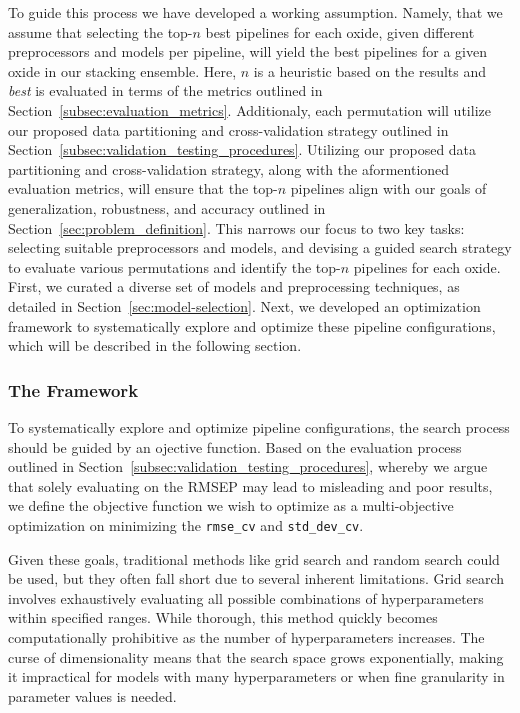 To guide this process we have developed a working assumption.
Namely, that we assume that selecting the top-$n$ best pipelines for each oxide, given different preprocessors and models per pipeline, will yield the best pipelines for a given oxide in our stacking ensemble.
Here, $n$ is a heuristic based on the results and \textit{best} is evaluated in terms of the metrics outlined in Section~\ref{subsec:evaluation_metrics}.
Additionaly, each permutation will utilize our proposed data partitioning and cross-validation strategy outlined in Section~\ref{subsec:validation_testing_procedures}.
Utilizing our proposed data partitioning and cross-validation strategy, along with the aformentioned evaluation metrics, will ensure that the top-$n$ pipelines align with our goals of generalization, robustness, and accuracy outlined in Section~\ref{sec:problem_definition}.
This narrows our focus to two key tasks: selecting suitable preprocessors and models, and devising a guided search strategy to evaluate various permutations and identify the top-$n$ pipelines for each oxide. 
First, we curated a diverse set of models and preprocessing techniques, as detailed in Section~\ref{sec:model-selection}.
Next, we developed an optimization framework to systematically explore and optimize these pipeline configurations, which will be described in the following section.

\subsubsection{The Framework}
To systematically explore and optimize pipeline configurations, the search process should be guided by an ojective function.
Based on the evaluation process outlined in Section~\ref{subsec:validation_testing_procedures}, whereby we argue that solely evaluating on the RMSEP may lead to misleading and poor results, we define the objective function we wish to optimize as a multi-objective optimization on minimizing the \texttt{rmse\_cv} and \texttt{std\_dev\_cv}. 

Given these goals, traditional methods like grid search and random search could be used, but they often fall short due to several inherent limitations. 
Grid search involves exhaustively evaluating all possible combinations of hyperparameters within specified ranges. 
While thorough, this method quickly becomes computationally prohibitive as the number of hyperparameters increases. 
The curse of dimensionality means that the search space grows exponentially, making it impractical for models with many hyperparameters or when fine granularity in parameter values is needed. 

